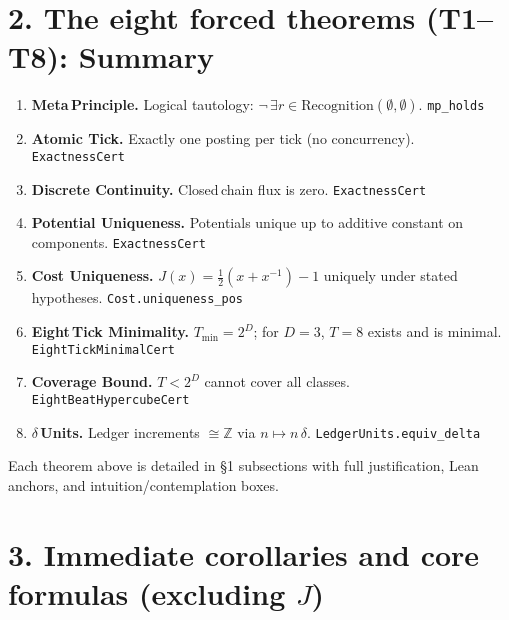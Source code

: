 \documentclass[11pt]{article}
\begin{document}
\section*{2. The eight forced theorems (T1--T8): Summary}

\begin{tcolorbox}[
  colback=gray!5,
  colframe=rsblue,
  boxrule=2pt,
  arc=2mm,
  left=10pt,
  right=10pt,
  top=10pt,
  bottom=10pt,
  title={\textbf{The Complete Stack}}
]
\begin{enumerate}[label=\textbf{T\arabic*.}, leftmargin=2em, itemsep=4pt]
  \item \textbf{Meta\,Principle.} Logical tautology: $\neg\,\exists r\in \mathrm{Recognition}(\emptyset,\emptyset)$. \hfill \texttt{mp\_holds}
  \item \textbf{Atomic Tick.} Exactly one posting per tick (no concurrency). \hfill \texttt{ExactnessCert}
  \item \textbf{Discrete Continuity.} Closed\,chain flux is zero. \hfill \texttt{ExactnessCert}
  \item \textbf{Potential Uniqueness.} Potentials unique up to additive constant on components. \hfill \texttt{ExactnessCert}
  \item \textbf{Cost Uniqueness.} $J(x)=\tfrac12(x+x^{-1})-1$ uniquely under stated hypotheses. \hfill \texttt{Cost.uniqueness\_pos}
  \item \textbf{Eight\,Tick Minimality.} $T_{\min}=2^D$; for $D=3$, $T=8$ exists and is minimal. \hfill \texttt{EightTickMinimalCert}
  \item \textbf{Coverage Bound.} $T<2^D$ cannot cover all classes. \hfill \texttt{EightBeatHypercubeCert}
  \item \textbf{$\delta$\,Units.} Ledger increments $\cong\mathbb Z$ via $n\mapsto n\,\delta$. \hfill \texttt{LedgerUnits.equiv\_delta}
\end{enumerate}
\end{tcolorbox}

\vspace{1em}
\noindent Each theorem above is detailed in \S1 subsections with full justification, Lean anchors, and intuition/contemplation boxes.

\section*{3. Immediate corollaries and core formulas (excluding $J$)}
\end{document}

